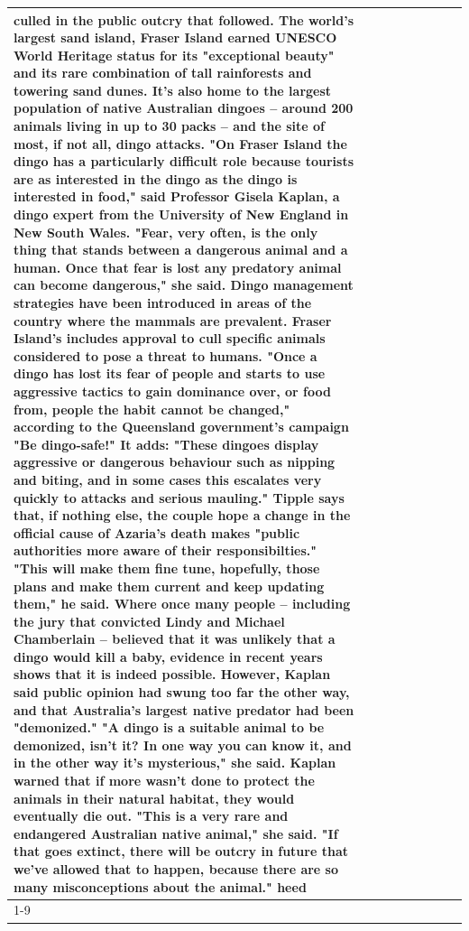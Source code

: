 \begin{table}[H]
\begin{tabular}{lllrlllll}
culled in the public outcry that followed. The world's largest sand island, Fraser Island earned UNESCO World Heritage status for its "exceptional beauty" and its rare combination of tall rainforests and towering sand dunes. It's also home to the largest population of native Australian dingoes -- around 200 animals living in up to 30 packs -- and the site of most, if not all, dingo attacks. "On Fraser Island the dingo has a particularly difficult role because tourists are as interested in the dingo as the dingo is interested in food," said Professor Gisela Kaplan, a dingo expert from the University of New England in New South Wales. "Fear, very often, is the only thing that stands between a dangerous animal and a human. Once that fear is lost any predatory animal can become dangerous," she said. Dingo management strategies have been introduced in areas of the country where the mammals are prevalent. Fraser Island's includes approval to cull specific animals considered to pose a threat to humans. "Once a dingo has lost its fear of people and starts to use aggressive tactics to gain dominance over, or food from, people the habit cannot be changed," according to the Queensland government's campaign "Be dingo-safe!" It adds: "These dingoes display aggressive or dangerous behaviour such as nipping and biting, and in some cases this escalates very quickly to attacks and serious mauling." Tipple says that, if nothing else, the couple hope a change in the official cause of Azaria's death makes "public authorities more aware of their responsibilties." "This will make them fine tune, hopefully, those plans and make them current and keep updating them," he said. Where once many people -- including the jury that convicted Lindy and Michael Chamberlain -- believed that it was unlikely that a dingo would kill a baby, evidence in recent years shows that it is indeed possible. However, Kaplan said public opinion had swung too far the other way, and that Australia's largest native predator had been "demonized." "A dingo is a suitable animal to be demonized, isn't it? In one way you can know it, and in the other way it's mysterious," she said. Kaplan warned that if more wasn't done to protect the animals in their natural habitat, they would eventually die out. "This is a very rare and endangered Australian native animal," she said. "If that goes extinct, there will be outcry in future that we've allowed that to happen, because there are so many misconceptions about the animal." heed \\
\cline{1-9}

\end{tabular}
\end{table}
